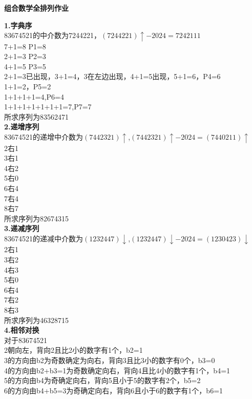 \documentclass[a4paper,12pt]{article}
\begin{document}
	
	\begin{center}
		{\large \textbf{组合数学全排列作业}}
	\end{center}
	
	\noindent
	\textbf{1.字典序}\\
	83674521的中介数为7244221，$(7244221)\uparrow-2024=7242111$\\
	7+1=8  P1=8\\
	2+1=3  P2=3\\
	4+1=5  P3=5\\
	2+1=3已出现，3+1=4，3在左边出现，4+1=5出现，5+1=6，P4=6\\
	1+1=2，P5=2\\
	1+1+1+1=4,P6=4\\
	1+1+1+1+1+1+1=7,P7=7\\
	所求序列为83562471\\
	\textbf{2.递增序列}\\
	83674521的递增中介数为$(7442321)\uparrow$,$(7442321)\uparrow-2024=(7440211)\uparrow$\\
	2右1\\
	3右1\\
	4右2\\
	5右0\\
	6右4\\
	7右4\\
	8右7\\
	所求序列为82674315\\
	\textbf{3.递减序列}\\
	83674521的递减中介数为$(1232447)\downarrow$,$(1232447)\downarrow-2024=(1230423)\downarrow$\\
	2右1\\
	3右2\\
	4右3\\
	5右0\\
	6右4\\
	7右2\\
	8右3\\
	所求序列为46328715\\
	\textbf{4.相邻对换}\\
	对于83674521\\
	2朝向左，背向2且比2小的数字有1个，b2=1\\
	3的方向由b2为奇数确定为向右，背向3且比3小的数字有0个，b3=0\\
	4的方向由b2+b3=1为奇数确定向右，背向4且比4小的数字有1个，b4=1\\
	5的方向由b4为奇确定向右，背向5且小于5的数字有2个，b5=2\\
	6的方向由b4+b5=3为奇确定向右，背向6且小于6的数字有1个，b6=1\\
\end{document}
